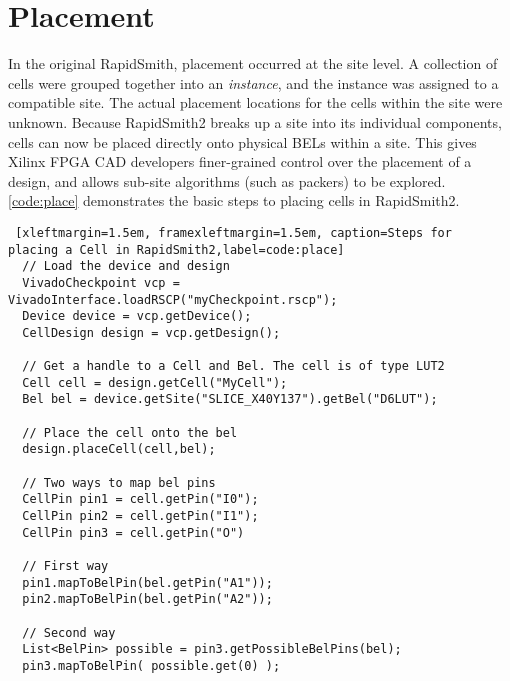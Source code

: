 \newpage
\section{Placement} \label{sec:placement}
\graphicspath{{./techReportFigures/sec6_placement/}}

In the original RapidSmith, placement occurred at the site level. A
collection of cells were grouped together into an \textit{instance}, and the
instance was assigned to a compatible site. The actual placement locations
for the cells within the site were unknown. Because RapidSmith2 breaks up a
site into its individual components, cells can now be placed directly onto
physical BELs within a site. This gives Xilinx FPGA CAD developers finer-grained
control over the placement of a design, and allows sub-site algorithms (such as
packers) to be explored. \autoref{code:place} demonstrates the basic steps to
placing cells in RapidSmith2.

\begin{lstlisting} [xleftmargin=1.5em, framexleftmargin=1.5em, caption=Steps for
placing a Cell in RapidSmith2,label=code:place]
  // Load the device and design
  VivadoCheckpoint vcp = VivadoInterface.loadRSCP("myCheckpoint.rscp"); 
  Device device = vcp.getDevice();
  CellDesign design = vcp.getDesign();

  // Get a handle to a Cell and Bel. The cell is of type LUT2 
  Cell cell = design.getCell("MyCell"); 
  Bel bel = device.getSite("SLICE_X40Y137").getBel("D6LUT");

  // Place the cell onto the bel
  design.placeCell(cell,bel);

  // Two ways to map bel pins
  CellPin pin1 = cell.getPin("I0");
  CellPin pin2 = cell.getPin("I1");
  CellPin pin3 = cell.getPin("O")

  // First way
  pin1.mapToBelPin(bel.getPin("A1"));
  pin2.mapToBelPin(bel.getPin("A2"));

  // Second way
  List<BelPin> possible = pin3.getPossibleBelPins(bel);
  pin3.mapToBelPin( possible.get(0) );
\end{lstlisting}

